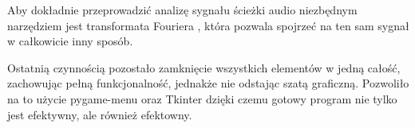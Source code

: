 Aby dokładnie przeprowadzić analizę sygnału ścieżki audio niezbędnym narzędziem jest transformata Fouriera \cite{fourier_transform_visual}\cite{dsp_understanding}, która pozwala spojrzeć na ten sam sygnał w całkowicie inny sposób.

Ostatnią czynnością pozostało zamknięcie wszystkich elementów w jedną całość, zachowując pełną funkcjonalność, jednakże nie odstając szatą graficzną. Pozwoliło na to użycie {pygame-menu} \cite{pygame_menu} oraz {Tkinter} \cite{tkinter} dzięki czemu gotowy program nie tylko jest efektywny, ale również efektowny.
